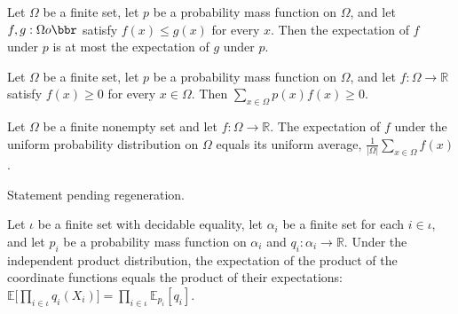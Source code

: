\begin{theorem}
\label{FABL.pmfExpectation_mono}
\leanok
{}
Let $\Omega$ be a finite set, let $p$ be a probability mass function on $\Omega$, and
let $f,g:\Omega	o\bbr$ satisfy $f(x)\le g(x)$ for every $x$. Then the expectation of $f$
under $p$ is at most the expectation of $g$ under $p$.
\end{theorem}

\begin{theorem}
\label{FABL.pmfExpectation_nonneg}
\leanok
{}
Let $\Omega$ be a finite set, let $p$ be a probability mass function on $\Omega$, and
let $f:\Omega\to\mathbb R$ satisfy $f(x)\ge 0$ for every $x\in\Omega$. Then
$\sum_{x\in\Omega}p(x)f(x)\ge 0$.
\end{theorem}

\begin{theorem}
\label{FABL.pmfExpectation_uniformPMF_eq_expect}
\leanok
{}
Let $\Omega$ be a finite nonempty set and let $f:\Omega\to\mathbb R$. The expectation of
$f$ under the uniform probability distribution on $\Omega$ equals its uniform average,
$\frac{1}{|\Omega|}\sum_{x\in\Omega}f(x)$.
\end{theorem}

\begin{theorem}
\label{FABL.pmfExpectation_coordinateNoisePMF_signValue}
\leanok
{}
Statement pending regeneration.
\end{theorem}

\begin{theorem}
\label{FABL.pmfExpectation_independentProductPMF_prod}
\leanok
{}
Let $\iota$ be a finite set with decidable equality, let $\alpha_i$ be a finite set for
each $i\in\iota$, and let $p_i$ be a probability mass function on $\alpha_i$ and
$q_i:\alpha_i\to\mathbb{R}$. Under the independent product distribution, the expectation
of the product of the coordinate functions equals the product of their expectations:
$\mathbb{E}\bigl[\prod_{i\in\iota}q_i(X_i)\bigr]=\prod_{i\in\iota}\mathbb{E}_{p_i}[q_i]$.
\end{theorem}

